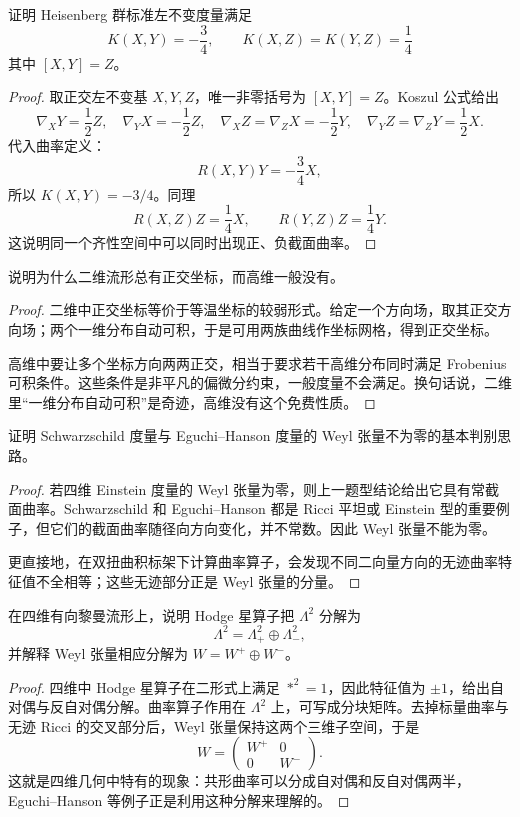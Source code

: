 \documentclass[11pt,a4paper,openany]{ctexbook}
\numberwithin{equation}{chapter}
\begin{document}
\begin{problem}
证明 Heisenberg 群标准左不变度量满足
\[
K(X,Y)=-\frac34,\qquad K(X,Z)=K(Y,Z)=\frac14
\]
其中 \([X,Y]=Z\)。
\end{problem}
\begin{proof}
取正交左不变基 \(X,Y,Z\)，唯一非零括号为 \([X,Y]=Z\)。Koszul 公式给出
\[
\nabla_XY=\frac12Z,\quad \nabla_YX=-\frac12Z,\quad
\nabla_XZ=\nabla_ZX=-\frac12Y,\quad
\nabla_YZ=\nabla_ZY=\frac12X.
\]
代入曲率定义：
\[
R(X,Y)Y=-\frac34X,
\]
所以 \(K(X,Y)=-3/4\)。同理
\[
R(X,Z)Z=\frac14X,\qquad R(Y,Z)Z=\frac14Y.
\]
这说明同一个齐性空间中可以同时出现正、负截面曲率。
\end{proof}

\begin{problem}
说明为什么二维流形总有正交坐标，而高维一般没有。
\end{problem}
\begin{proof}
二维中正交坐标等价于等温坐标的较弱形式。给定一个方向场，取其正交方向场；两个一维分布自动可积，于是可用两族曲线作坐标网格，得到正交坐标。

高维中要让多个坐标方向两两正交，相当于要求若干高维分布同时满足 Frobenius 可积条件。这些条件是非平凡的偏微分约束，一般度量不会满足。换句话说，二维里“一维分布自动可积”是奇迹，高维没有这个免费性质。
\end{proof}

\begin{problem}
证明 Schwarzschild 度量与 Eguchi--Hanson 度量的 Weyl 张量不为零的基本判别思路。
\end{problem}
\begin{proof}
若四维 Einstein 度量的 Weyl 张量为零，则上一题型结论给出它具有常截面曲率。Schwarzschild 和 Eguchi--Hanson 都是 Ricci 平坦或 Einstein 型的重要例子，但它们的截面曲率随径向方向变化，并不常数。因此 Weyl 张量不能为零。

更直接地，在双扭曲积标架下计算曲率算子，会发现不同二向量方向的无迹曲率特征值不全相等；这些无迹部分正是 Weyl 张量的分量。
\end{proof}

\begin{problem}
在四维有向黎曼流形上，说明 Hodge 星算子把 \(\Lambda^2\) 分解为
\[
\Lambda^2=\Lambda^2_+\oplus\Lambda^2_-,
\]
并解释 Weyl 张量相应分解为 \(W=W^+\oplus W^-\)。
\end{problem}
\begin{proof}
四维中 Hodge 星算子在二形式上满足 \(*^2=1\)，因此特征值为 \(\pm1\)，给出自对偶与反自对偶分解。曲率算子作用在 \(\Lambda^2\) 上，可写成分块矩阵。去掉标量曲率与无迹 Ricci 的交叉部分后，Weyl 张量保持这两个三维子空间，于是
\[
W=\begin{pmatrix}W^+&0\\0&W^-\end{pmatrix}.
\]
这就是四维几何中特有的现象：共形曲率可以分成自对偶和反自对偶两半，Eguchi--Hanson 等例子正是利用这种分解来理解的。
\end{proof}
\end{document}
